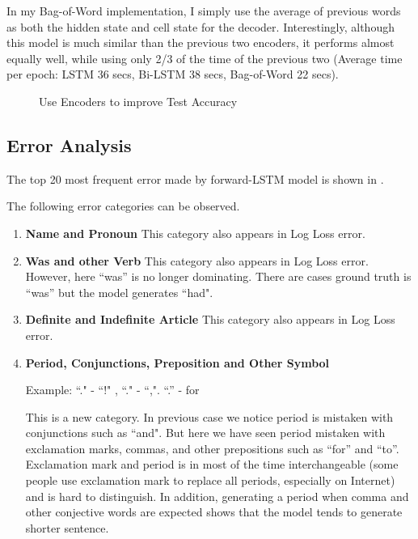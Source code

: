 \documentclass{article}
\begin{document}
In my Bag-of-Word implementation, I simply use the average of previous words as both the hidden state and cell state for the decoder. Interestingly, although this model is much similar than the previous two encoders, it performs almost equally well, while using only 2/3 of the time of the previous two (Average time per epoch: LSTM 36 secs, Bi-LSTM 38 secs, Bag-of-Word 22 secs).
\begin{figure}
\centering
{}
\caption{Use Encoders to improve Test Accuracy}
\label{fig:encoder}
\end{figure}

\subsection{Error Analysis}
The top 20 most frequent error made by forward-LSTM model is shown in .

The following error categories can be observed.

\begin{enumerate}
\item \textbf{Name and Pronoun} This category also appears in Log Loss error.
\item \textbf{Was and other Verb} This category also appears in Log Loss error. However, here ``was'' is no longer dominating. There are cases ground truth is ``was'' but the model generates ``had".
\item \textbf{Definite and Indefinite Article} This category also appears in Log Loss error.
\item \textbf{Period, Conjunctions, Preposition and Other Symbol} 

Example: ``." - ``!" , ``." - ``,". ``.'' - for

This is a new category. In previous case we notice period is mistaken with conjunctions such as ``and". But here we have seen period mistaken with exclamation marks, commas, and other prepositions such as ``for'' and ``to''. Exclamation mark and period is in most of the time interchangeable (some people use exclamation mark to replace all periods, especially on Internet) and is hard to distinguish. In addition, generating a period when comma and other conjective words are expected shows that the model tends to generate shorter sentence.

\end{enumerate}
\end{document}
